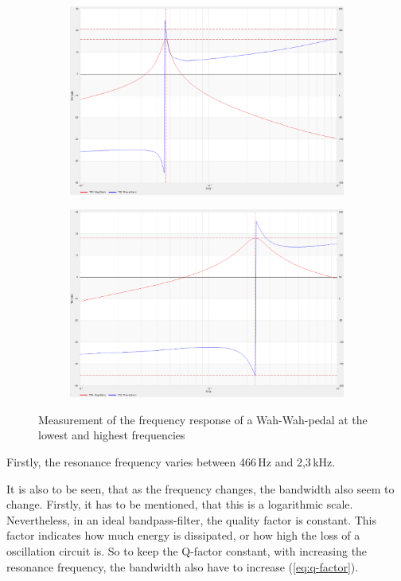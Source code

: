 \begin{figure}[!h]
    \centering
    \begin{subfigure}[c]{0.45\textwidth}
        \centering
        \includegraphics[width=\textwidth]{img/wahwah-1.png}
    \end{subfigure}
    \begin{subfigure}[c]{0.45\textwidth}
        \centering
        \includegraphics[width=\textwidth]{img/wahwah-2.png}
    \end{subfigure}
    \caption{Measurement of the frequency response of a Wah-Wah-pedal at the lowest and highest frequencies}
    \label{fig:wahwah-filter}
\end{figure}

Firstly, the resonance frequency varies between 466\,Hz and 2,3\,kHz.

It is also to be seen, that as the frequency changes, the bandwidth also seem to change. Firstly, it has to be mentioned,
that this is a logarithmic scale. Nevertheless, in an ideal bandpass-filter, the quality factor is constant. This factor indicates
how much energy is dissipated, or how high the loss of a oscillation circuit is. So to keep the Q-factor constant, with
increasing the resonance frequency, the bandwidth also have to increase (\autoref{eq:q-factor}).

